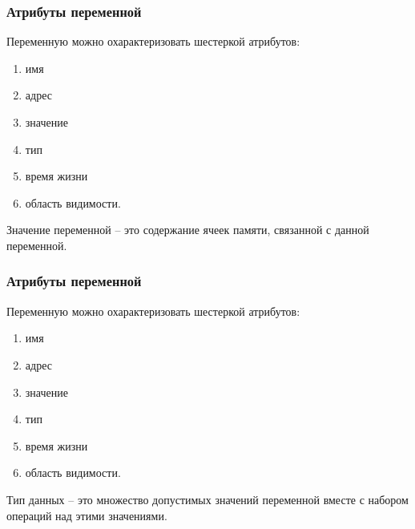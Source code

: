 	\begin{frame}
\frametitle{Атрибуты переменной}



Переменную можно охарактеризовать шестеркой атрибутов:
\setlength{\columnsep}{0.4cm}
\begin{multicols}{2}
\begin{enumerate}
\item имя
\item адрес
\item значение
\item тип
\item время жизни
\item область видимости.
\end{enumerate}

\columnbreak
Значение переменной – это содержание ячеек памяти, связанной с данной переменной.
\end{multicols}

\end{frame}

	\begin{frame}
\frametitle{Атрибуты переменной}

Переменную можно охарактеризовать шестеркой атрибутов:
\setlength{\columnsep}{0.4cm}
\begin{multicols}{2}
\begin{enumerate}
\item имя
\item адрес
\item значение
\item тип
\item время жизни
\item область видимости.
\end{enumerate}

\columnbreak
 
Тип данных – это множество допустимых значений переменной вместе с набором операций над этими значениями.

\end{multicols}

\end{frame}

